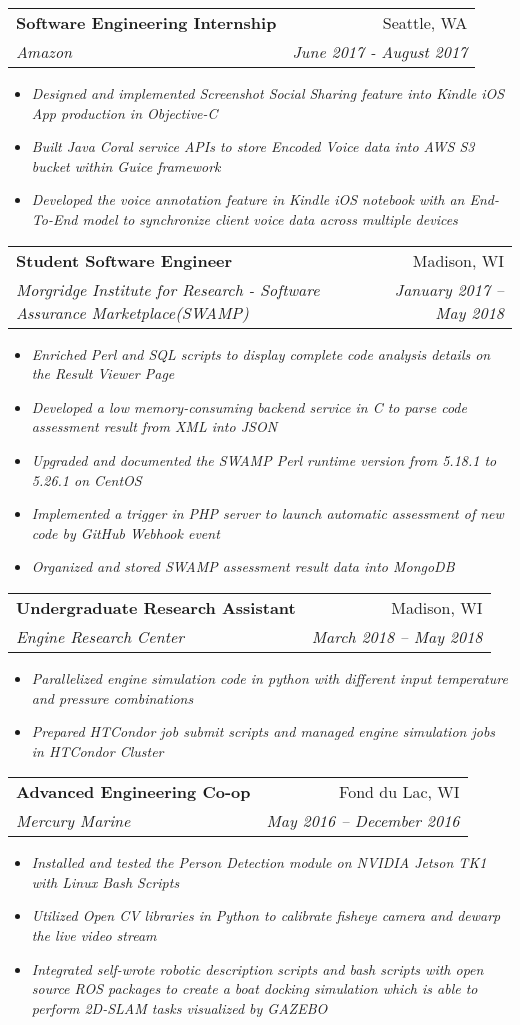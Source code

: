 \documentclass[a4paper,11pt]{article}
\makeatletter
\newcommand{\experienceItemStart}{\begin{itemize}}
\newcommand{\experienceItemEnd}{\end{itemize}\vspace{-5pt}}
\newcommand{\experienceItem}[1]{
  \item\small{
    \textit{#1 \vspace{-3pt}}
  }
}
\newcommand{\experienceHeader}[4]{
  \vspace{-1pt}\item
    \begin{tabular*}{0.97\textwidth}{l@{\extracolsep{\fill}}r}
      \textbf{#1} & #2 \\
      \textit{\small#3} & \textit{\small #4} \\
    \end{tabular*}\vspace{-5pt}
}
\makeatother
\begin{document}
		\experienceHeader
		{Software Engineering Internship}{Seattle, WA}
		{Amazon}{June 2017 - August 2017}
			\experienceItemStart	
				\experienceItem
				{Designed and implemented Screenshot Social Sharing feature into Kindle iOS App production in Objective-C}		
				\experienceItem
				{Built Java Coral service APIs to store Encoded Voice data into AWS S3 bucket within Guice framework}
				\experienceItem
				{Developed the voice annotation feature in Kindle iOS notebook with an End-To-End model to synchronize client voice data across multiple devices}
			\experienceItemEnd
		
		\experienceHeader
		{Student Software Engineer}{Madison, WI}
		{Morgridge Institute for Research - Software Assurance Marketplace(SWAMP)}{January 2017 – May 2018}	
			\experienceItemStart	
				\experienceItem
				{Enriched Perl and SQL scripts to display complete code analysis details on the Result Viewer Page}
				\experienceItem
				{Developed a low memory-consuming backend service in C to parse code assessment result from XML into JSON}
				\experienceItem
				{Upgraded and documented the SWAMP Perl runtime version from 5.18.1 to 5.26.1 on CentOS}	
				\experienceItem
				{Implemented a trigger in PHP server to launch automatic assessment of new code by GitHub Webhook event}		
				\experienceItem
				{Organized and stored SWAMP assessment result data into MongoDB}		
			\experienceItemEnd
		
		\experienceHeader
		{Undergraduate Research Assistant}{Madison, WI}
		{Engine Research Center}{March 2018 –  May 2018}
			\experienceItemStart
				\experienceItem
				{Parallelized engine simulation code in python with different input temperature and pressure combinations}
				\experienceItem
				{Prepared HTCondor job submit scripts and managed engine simulation jobs in HTCondor Cluster}		
			\experienceItemEnd
			
		\experienceHeader
		{Advanced Engineering Co-op }{Fond du Lac, WI}
		{Mercury Marine}{May 2016 – December 2016}
			\experienceItemStart
				\experienceItem
				{Installed and tested the Person Detection module on NVIDIA Jetson TK1 with Linux Bash Scripts}
				\experienceItem
				{Utilized Open CV libraries in Python to calibrate fisheye camera and dewarp the live video stream}		
				\experienceItem
				{Integrated self-wrote robotic description scripts and bash scripts with open source ROS packages to create a boat docking simulation which is able to perform 2D-SLAM tasks visualized by GAZEBO}	
			\experienceItemEnd	
		
\end{document}
